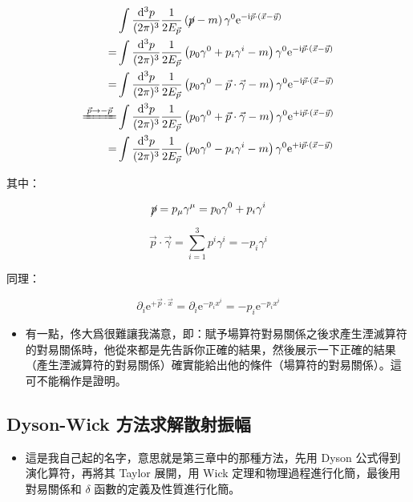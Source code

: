 \documentclass{article}
\begin{document}
$$
\begin{aligned}
& \int\frac{\mathrm{d}^3p}{(2\pi)^3}\frac{1}{2E_{\vec{p}}}\left(\cancel{p}-m\right)\gamma^0\mathrm{e}^{-\mathrm{i}\vec{p}\cdot(\vec{x}-\vec{y})}                           \\
=                               & \int\frac{\mathrm{d}^3p}{(2\pi)^3}\frac{1}{2E_{\vec{p}}}\left(p_0\gamma^0+p_i\gamma^i-m\right)\gamma^0\mathrm{e}^{-\mathrm{i}\vec{p}\cdot(\vec{x}-\vec{y})}              \\
=                               & \int\frac{\mathrm{d}^3p}{(2\pi)^3}\frac{1}{2E_{\vec{p}}}\left(p_0\gamma^0-\vec{p}\cdot\vec{\gamma}-m\right)\gamma^0\mathrm{e}^{-\mathrm{i}\vec{p}\cdot(\vec{x}-\vec{y})} \\
\xlongequal{\vec{p}\to-\vec{p}} & \int\frac{\mathrm{d}^3p}{(2\pi)^3}\frac{1}{2E_{\vec{p}}}\left(p_0\gamma^0+\vec{p}\cdot\vec{\gamma}-m\right)\gamma^0\mathrm{e}^{+\mathrm{i}\vec{p}\cdot(\vec{x}-\vec{y})} \\
=                               & \int\frac{\mathrm{d}^3p}{(2\pi)^3}\frac{1}{2E_{\vec{p}}}\left(p_0\gamma^0-p_i\gamma^i-m\right)\gamma^0\mathrm{e}^{+\mathrm{i}\vec{p}\cdot(\vec{x}-\vec{y})}              \\
\end{aligned}
$$

其中：

$$
\cancel{p}=p_{\mu}\gamma^{\mu}=p_0\gamma^0+p_i\gamma^i
$$

$$
\vec{p}\cdot\vec{\gamma}=\sum_{i=1}^3p^i\gamma^i=-p_i\gamma^i
$$

同理：

$$
\partial_i\mathrm{e}^{+\vec{p}\cdot\vec{x}}=\partial_i\mathrm{e}^{-p_ix^i}=-p_i\mathrm{e}^{-p_ix^i}
$$

\begin{itemize}
\item 有一點，佟大爲很難讓我滿意，即：賦予場算符對易關係之後求產生湮滅算符的對易關係時，他從來都是先告訴你正確的結果，然後展示一下正確的結果（產生湮滅算符的對易關係）確實能給出他的條件（場算符的對易關係）。這可不能稱作是證明。
\end{itemize}

\subsection{Dyson-Wick 方法求解散射振幅}

\begin{itemize}
\item 這是我自己起的名字，意思就是第三章中的那種方法，先用 Dyson 公式得到演化算符，再將其 Taylor 展開，用 Wick 定理和物理過程進行化簡，最後用對易關係和 $\delta$ 函數的定義及性質進行化簡。
\end{itemize}
\end{document}
